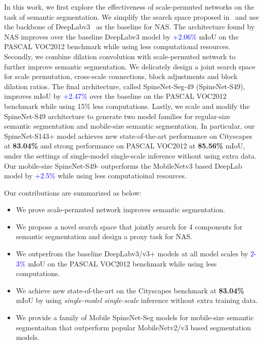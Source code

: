 \documentclass[10pt,twocolumn,letterpaper]{article}
\begin{document}
In this work, we first explore the effectiveness of scale-permuted networks on the task of semantic segmentation. We simplify the search space proposed in~\cite{spinenet} and use the backbone of DeepLabv3~\cite{deeplabv3} as the baseline for NAS. The architecture found by NAS improves over the baseline DeepLabv3 model by \textcolor{blue}{+2.06\%} mIoU on the PASCAL VOC2012 benchmark while using less computational resources.
Secondly, we combine dilation convolution with scale-permuted network to further improve semantic segmentation. We delicately design a joint search space for scale permutation, cross-scale connections, block adjustments and block dilation ratios. The final architecture, called SpineNet-Seg-49 (SpineNet-S49), improves mIoU by \textcolor{blue}{+2.47\%} over the baseline on the PASCAL VOC2012 benchmark while using 15\% less computations.
Lastly, we scale and modify the SpineNet-S49 architecture to generate two model families for regular-size semantic segmentation and mobile-size semantic segmentation. In particular, our SpineNet-S143+ model achieves new state-of-the-art performance on Cityscapes at \textbf{83.04\%} and strong performance on PASCAL VOC2012 at \textbf{85.56\%} mIoU, under the settings of single-model single-scale inference without using extra data. Our mobile-size SpineNet-S49- outperforms the MobileNetv3 based DeepLab model by \textcolor{blue}{+2.5\%} while using less computatioinal resources. 

Our contributions are summarized as below:

\begin{itemize}
    \itemsep0em
    \item We prove scale-permuted network improves semantic segmentation.
    \item We propose a novel search space that jointly search for 4 components for semantic segmentation and design a proxy task for NAS.
    \item We outperfrom the baseline DeepLabv3/v3+ models at all model scales by \textcolor{blue}{2-3\%} mIoU on the PASCAL VOC2012 benchmark while using less computations.
    \item We achieve new state-of-the-art on the Cityscapes benchmark at \textbf{83.04\%} mIoU by using \textit{single-model} \textit{single-scale} inference without extra training data.
    \item We provide a family of Mobile SpineNet-Seg models for mobile-size semantic segmentaiton that outperform popular MobileNetv2/v3 based segmentation models. 
\end{itemize}
\end{document}
